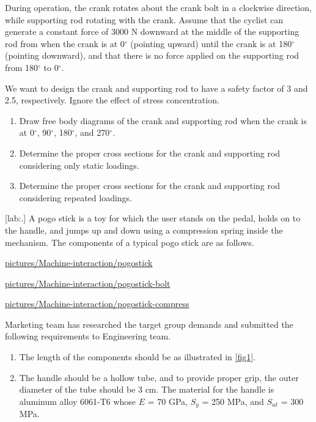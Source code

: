 \documentclass[a4paper,openany,nobib]{tufte-book}
\begin{document}
{{During operation, the crank rotates about the crank bolt in a clockwise
direction, while supporting rod rotating with the crank. Assume that the
cyclist can generate a constant force of 3000 N downward at the middle
of the supporting rod from when the crank is at 0\(^{\circ}\) (pointing
upward) until the crank is at 180\(^{\circ}\) (pointing downward), and
that there is no force applied on the supporting rod from 180\(^{\circ}\)
to 0\(^{\circ}\).

We want to design the crank and supporting rod to have a safety factor
of 3 and 2.5, respectively. Ignore the effect of stress concentration.

\begin{enumerate}
\item Draw free body diagrams of the crank and supporting rod when the
crank is at 0\(^{\circ}\), 90\(^{\circ}\), 180\(^{\circ}\), and
270\(^{\circ}\).

\item Determine the proper cross sections for the crank and supporting rod
considering only static loadings.

\item Determine the proper cross sections for the crank and supporting rod
considering repeated loadings.
\end{enumerate}

[lab:.] A pogo stick is a toy for
which the user stands on the pedal, holds on to the handle, and jumps up
and down using a compression spring inside the mechanism. The components
of a typical pogo stick are as follows.


\url{pictures/Machine-interaction/pogostick}

\hfill

\url{pictures/Machine-interaction/pogostick-bolt}

\url{pictures/Machine-interaction/pogostick-compress}

Marketing team has researched the target group demands and submitted the
following requirements to Engineering team.

\begin{enumerate}
\item The length of the components should be as illustrated in
\ref{fig1}.

\item The handle should be a hollow tube, and to provide proper grip, the
outer diameter of the tube should be 3 cm. The material for the
handle is aluminum alloy 6061-T6 whose \(E\) = 70 GPa, \(S_y\) = 250 MPa,
and \(S_{ut}\) = 300 MPa.


\end{enumerate}}}
\end{document}
